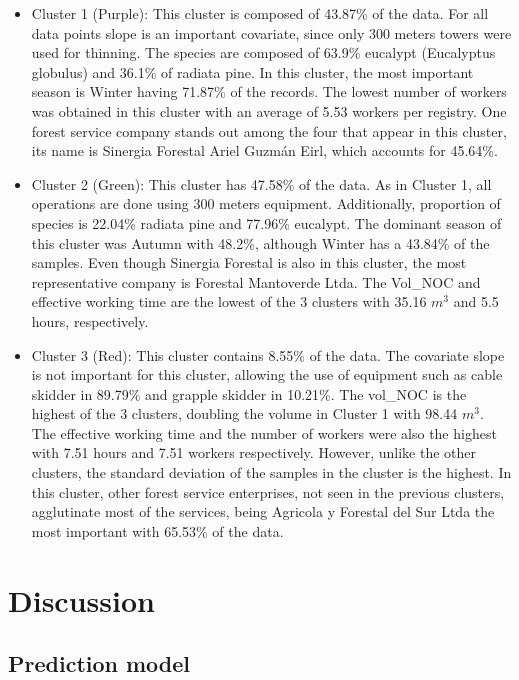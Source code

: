 \documentclass[conference]{IEEEtran}
\begin{document}
\begin{itemize}

\item{Cluster 1 (Purple):} This cluster is composed of 43.87\% of the data. For all data points slope is an important covariate, since only 300 meters towers were used for thinning. The species are composed of 63.9\% eucalypt (Eucalyptus globulus) and 36.1\% of radiata pine. In this cluster, the most important season is Winter having 71.87\% of the records. The lowest number of workers was obtained in this cluster with an average of 5.53 workers per registry. One forest service company stands out among the four that appear in this cluster, its name is Sinergia Forestal Ariel Guzmán Eirl, which accounts for 45.64\%. 

\item{Cluster 2 (Green):} This cluster has 47.58\% of the data. As in Cluster 1, all operations are done using 300 meters equipment. Additionally, proportion of species is 22.04\% radiata pine and 77.96\% eucalypt. The dominant season of this cluster was Autumn with 48.2\%, although Winter has a 43.84\% of the samples. Even though Sinergia Forestal is also in this cluster, the most representative company is Forestal Mantoverde Ltda. The  Vol\_NOC and effective working time are the lowest of the 3 clusters with 35.16 $m^{3}$ and 5.5 hours, respectively.

\item{Cluster 3 (Red):} This cluster contains 8.55\% of the data. The covariate slope is not important for this cluster, allowing the use of equipment such as cable skidder in 89.79\% and grapple skidder in 10.21\%. The vol\_NOC is the highest of the 3 clusters, doubling the volume in Cluster 1 with 98.44 $m^{3}$. The effective working time and the number of workers were also the highest with 7.51 hours and 7.51 workers respectively. However, unlike the other clusters, the standard deviation of the samples in the cluster is the highest. In this cluster, other forest service enterprises, not seen in the  previous clusters, agglutinate most of the services, being Agricola y Forestal del Sur Ltda the most important with 65.53\% of the data.

\end{itemize}

\section{Discussion}

\subsection{Prediction model}
\end{document}
